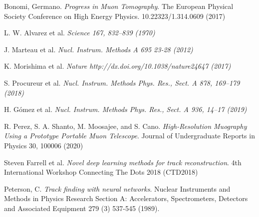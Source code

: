 \documentclass[10pt]{article}
\begin{document}
\begin{thebibliography}{1}
Bonomi, Germano.
\textit{Progress in Muon Tomography}.
The European Physical Society Conference on High Energy Physics. 10.22323/1.314.0609 (2017)

L. W. Alvarez et al.
\textit{Science 167, 832–839 (1970)}

J. Marteau et al.
\textit{Nucl. Instrum. Methods A 695 23-28 (2012)}

K. Morishima et al.
\textit{Nature http://dx.doi.org/10.1038/nature24647 (2017)}

S. Procureur et al.
\textit{Nucl. Instrum. Methods Phys. Res., Sect. A 878, 169–179 (2018)}

H. Gómez et al.
\textit{Nucl. Instrum. Methods Phys. Res., Sect. A 936, 14–17 (2019)}

R. Perez, S. A. Shanto, M. Moosajee, and S. Cano.
\textit{High-Resolution Muography Using a Prototype Portable Muon Telescope}. 
Journal of Undergraduate Reports in Physics 30, 100006 (2020)

Steven Farrell et al.
\textit{Novel deep learning methods for track reconstruction}.
4th International Workshop Connecting The Dots 2018 (CTD2018)

Peterson, C.
\textit{Track finding with neural networks}.
Nuclear Instruments and Methods in Physics Research Section A: Accelerators, Spectrometers, Detectors and Associated Equipment 279 (3) 537-545 (1989). 

\end{thebibliography}
\end{document}
